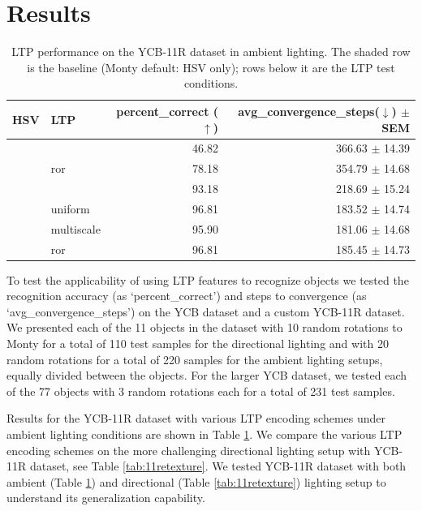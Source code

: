 \documentclass[runningheads]{llncs}
\newcommand{\tickm}{\ding{52}}
\newcommand{\cross}{\ding{56}}
\newcommand{\baserow}{\rowcolor{black!10}}
\begin{document}
\section{Results}
\begin{table}
    \vspace{-1cm}
    \setlength{\tabcolsep}{4pt}
    \renewcommand{\arraystretch}{1.25}
    \vspace{.1cm}
    \centering
    \begin{tabular}{l|l|r|r}
    \hline
    \textbf{HSV} & \textbf{LTP} & \textbf{percent\_correct ($\uparrow$)} & \textbf{avg\_convergence\_steps($\downarrow$) $\pm$ SEM}\\
    \hline \hline
             \cross & \cross     & 46.82 & 366.63 $\pm$ 14.39\\\hline
             \cross & ror        & 78.18 & 354.79 $\pm$ 14.68\\\hline
    \baserow \tickm & \cross     & 93.18 & 218.69 $\pm$ 15.24\\\hline
             \tickm & uniform    & 96.81 & 183.52 $\pm$ 14.74 \\\hline
             \tickm & multiscale & 95.90 & 181.06 $\pm$ 14.68\\\hline
             \tickm & ror        & 96.81 & 185.45 $\pm$ 14.73\\\hline

    \end{tabular}
    \vspace{.1cm}
    \caption{LTP performance on the YCB-11R dataset in ambient lighting. The shaded row is the baseline (Monty default: HSV only); rows below it are the LTP test conditions.}
    \label{tab:11retexture_amb}
    \vspace{-1cm}
\end{table}
To test the applicability of using LTP features to recognize objects we tested the recognition accuracy (as `percent\_correct') and steps to convergence (as `avg\_convergence\_steps') on the YCB dataset and a custom YCB-11R dataset. We presented each of the 11 objects in the dataset with 10 random rotations to Monty for a total of 110 test samples for the directional lighting and with 20 random rotations for a total of 220 samples for the ambient lighting setups, equally divided between the objects. For the larger YCB dataset, we tested each of the 77 objects with 3 random rotations each for a total of 231 test samples.

Results for the YCB-11R dataset with various LTP encoding schemes under ambient lighting conditions are shown in Table \ref{tab:11retexture_amb}. We compare the various LTP encoding schemes on the more challenging directional lighting setup with YCB-11R dataset, see Table \ref{tab:11retexture}. We tested YCB-11R dataset with both ambient (Table \ref{tab:11retexture_amb}) and directional (Table \ref{tab:11retexture}) lighting setup to understand its generalization capability.  
\end{document}
